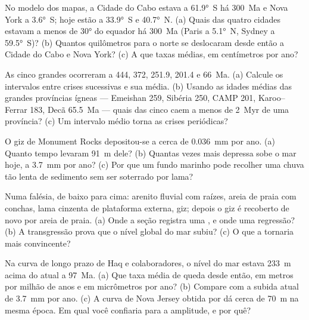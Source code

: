 \begin{exercise}[$\star$]\label{exo:b2:phanerozoic-earth:1}
No modelo dos mapas, a Cidade do Cabo estava a \ang{61.9}~S há \qty{300}{Ma} e Nova York a
\ang{3.6}~S; hoje estão a \ang{33.9}~S e \ang{40.7}~N. (a) Quais das quatro cidades estavam
a menos de \ang{30} do equador há \qty{300}{Ma} (Paris a \ang{5.1}~N, Sydney a
\ang{59.5}~S)? (b) Quantos quilômetros para o norte se deslocaram desde então a Cidade do Cabo e Nova York?
(c) A que taxas médias, em centímetros por ano?
\end{exercise}

\begin{exercise}[$\star$]\label{exo:b2:phanerozoic-earth:2}
As cinco grandes ocorreram a 444, 372, 251.9, 201.4 e \qty{66}{Ma}. (a) Calcule os intervalos entre
crises sucessivas e sua média. (b) Usando as idades médias das grandes províncias ígneas ---
Emeishan 259, Sibéria 250, CAMP 201, Karoo--Ferrar 183, Decã \qty{65.5}{Ma} --- quais das
cinco caem a menos de \qty{2}{Myr} de uma província? (c) Um intervalo médio torna as crises periódicas?
\end{exercise}

\begin{exercise}[$\star$]\label{exo:b2:phanerozoic-earth:3}
O giz de Monument Rocks depositou-se a cerca de \qty{0.036}{mm} por ano. (a) Quanto tempo levaram
\qty{91}{m} dele? (b) Quantas vezes mais depressa sobe o mar hoje, a \qty{3.7}{mm} por
ano? (c) Por que um fundo marinho pode recolher uma chuva tão lenta de sedimento sem ser soterrado por lama?
\end{exercise}

\begin{exercise}[$\star$]\label{exo:b2:phanerozoic-earth:4}
Numa falésia, de baixo para cima: arenito fluvial com raízes, areia de praia com conchas, lama cinzenta
de plataforma externa, giz; depois o giz é recoberto de novo por areia de praia. (a) Onde a seção registra uma
, e onde uma regressão? (b) A transgressão prova que o nível global do mar
subiu? (c) O que a tornaria mais convincente?
\end{exercise}

\begin{exercise}[$\star\star$]\label{exo:b2:phanerozoic-earth:5}
Na curva de longo prazo de Haq e colaboradores, o nível do mar estava \qty{233}{m} acima do atual a
\qty{97}{Ma}. (a) Que taxa média de queda desde então, em metros por milhão de anos e em
micrômetros por ano? (b) Compare com a subida atual de \qty{3.7}{mm} por ano. (c) A curva de Nova Jersey
obtida por  dá cerca de \qty{70}{m} na mesma época. Em qual você confiaria para a
amplitude, e por quê?
\end{exercise}

